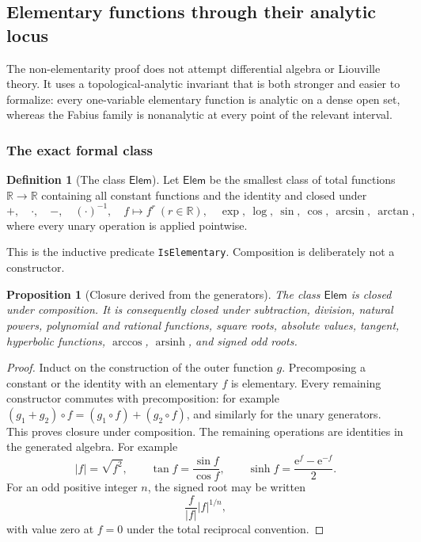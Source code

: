 \documentclass[11pt,oneside]{article}
\newtheorem{proposition}[proposition]{Proposition}
\theoremstyle{definition}
\newtheorem{definition}[definition]{Definition}
\theoremstyle{remark}
\newcommand{\R}{\mathbb R}
\newcommand{\e}{\mathrm e}
\newcommand{\lean}[1]{%
  \ifmmode\text{\texttt{\detokenize{#1}}}\else\nolinkurl{#1}\fi}
\begin{document}
\subsection{Elementary functions through their analytic locus}
\label{integration:sec:elementary}

The non-elementarity proof does not attempt differential algebra or Liouville theory.  It
uses a topological-analytic invariant that is both stronger and easier to formalize: every
one-variable elementary function is analytic on a dense open set, whereas the Fabius family
is nonanalytic at every point of the relevant interval.

\subsubsection{The exact formal class}

\begin{definition}[The class $\mathsf{Elem}$]
\label{integration:def:elementary-class}
Let $\mathsf{Elem}$ be the smallest class of total functions $\R\to\R$ containing all
constant functions and the identity and closed under
\begin{equation}
 +,\quad\cdot,\quad-,\quad(\cdot)^{-1},\quad
 f\mapsto f^r\ (r\in\R),\quad
 \exp,\ \log,\ \sin,\ \cos,\ \arcsin,\ \arctan,
 \label{integration:eq:elementary-generators}
\end{equation}
where every unary operation is applied pointwise.
\end{definition}

This is the inductive predicate \lean{IsElementary}.  Composition is deliberately not a
constructor.

\begin{proposition}[Closure derived from the generators]
\label{integration:prop:elementary-derived}
The class $\mathsf{Elem}$ is closed under composition.  It is consequently closed under
subtraction, division, natural powers, polynomial and rational functions, square roots,
absolute values, tangent, hyperbolic functions, $\arccos$, $\operatorname{arsinh}$, and
signed odd roots.
\end{proposition}

\begin{proof}
Induct on the construction of the outer function $g$.  Precomposing a constant or the
identity with an elementary $f$ is elementary.  Every remaining constructor commutes with
precomposition: for example $(g_1+g_2)\circ f=(g_1\circ f)+(g_2\circ f)$, and similarly for
the unary generators.  This proves closure under composition.  The remaining operations
are identities in the generated algebra.  For example
\[
 |f|=\sqrt{f^2},
 \qquad
 \tan f=\frac{\sin f}{\cos f},
 \qquad
 \sinh f=\frac{\e^f-\e^{-f}}2.
\]
For an odd positive integer $n$, the signed root may be written
\[
 \frac{f}{|f|}|f|^{1/n},
\]
with value zero at $f=0$ under the total reciprocal convention.
\end{proof}
\end{document}

